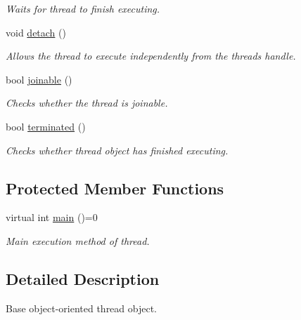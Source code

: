 \begin{DoxyCompactItemize}
\begin{DoxyCompactList}\small\item\em Waits for thread to finish executing. \end{DoxyCompactList}\item 
\mbox{\label{classcpen333_1_1thread_1_1thread__object_a6e6fd163c5f5f72dcd6385a74ad316b6}} 
void \hyperlink{classcpen333_1_1thread_1_1thread__object_a6e6fd163c5f5f72dcd6385a74ad316b6}{detach} ()
\begin{DoxyCompactList}\small\item\em Allows the thread to execute independently from the thread\textquotesingle{}s handle. \end{DoxyCompactList}\item 
bool \hyperlink{classcpen333_1_1thread_1_1thread__object_a374e31ea56accc37a3468012a411da5d}{joinable} ()
\begin{DoxyCompactList}\small\item\em Checks whether the thread is joinable. \end{DoxyCompactList}\item 
bool \hyperlink{classcpen333_1_1thread_1_1thread__object_a3f7f0eb9632797cbd86dc4b84f38baed}{terminated} ()
\begin{DoxyCompactList}\small\item\em Checks whether thread object has finished executing. \end{DoxyCompactList}\end{DoxyCompactItemize}
\subsection*{Protected Member Functions}
\begin{DoxyCompactItemize}
\item 
virtual int \hyperlink{classcpen333_1_1thread_1_1thread__object_adbd74f6f7461d90a1c12e8078aa5f3af}{main} ()=0
\begin{DoxyCompactList}\small\item\em Main execution method of thread. \end{DoxyCompactList}\end{DoxyCompactItemize}


\subsection{Detailed Description}
Base object-\/oriented thread object. 

